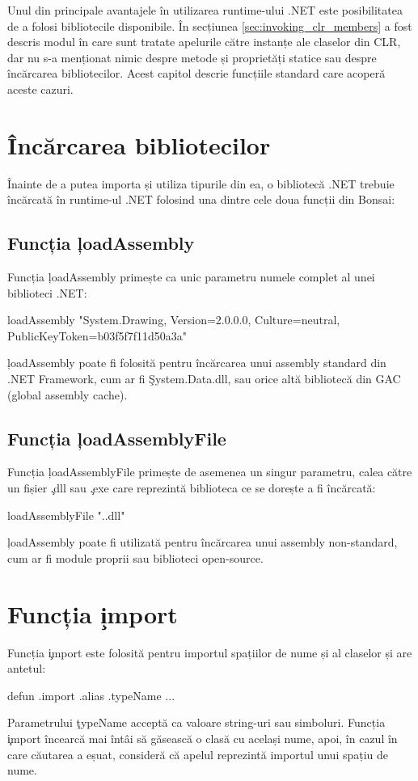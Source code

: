 \documentclass[12pt,a4paper]{memoir}
\begin{document}
Unul din principale avantajele în utilizarea runtime-ului .NET este posibilitatea de a folosi bibliotecile disponibile. În secțiunea \ref{sec:invoking_clr_members} a fost descris modul în care sunt tratate apelurile către instanțe ale claselor din CLR, dar nu s-a menționat nimic despre metode și proprietăți statice sau despre încărcarea bibliotecilor. Acest capitol descrie funcțiile standard care acoperă aceste cazuri.

\section{Încărcarea bibliotecilor}

Înainte de a putea importa și utiliza tipurile din ea, o bibliotecă .NET trebuie încărcată în runtime-ul .NET folosind una dintre cele doua funcții din Bonsai:

\subsection{Funcția \c{loadAssembly}}

Funcția \c{loadAssembly} primește ca unic parametru numele complet al unei biblioteci .NET:
\begin{code}
loadAssembly "System.Drawing, Version=2.0.0.0, Culture=neutral, 
              PublicKeyToken=b03f5f7f11d50a3a"
\end{code}
\c{loadAssembly} poate fi folosită pentru încărcarea unui assembly standard din .NET Framework, cum ar fi \c{System.Data.dll}, sau orice altă bibliotecă din GAC (global assembly cache).

\subsection{Funcția \c{loadAssemblyFile}}
Funcția \c{loadAssemblyFile} primește de asemenea un singur parametru, calea către un fișier \c{.dll} sau \c{.exe} care reprezintă biblioteca ce se dorește a fi încărcată:
\begin{code}
loadAssemblyFile ".\Lib\MyLibrary.dll"
\end{code}
\c{loadAssembly} poate fi utilizată pentru încărcarea unui assembly non-standard, cum ar fi module proprii sau biblioteci open-source.

\section{Funcția \c{import}}

Funcția \c{import} este folosită pentru importul spațiilor de nume și al claselor și are antetul:
\begin{code}
defun .import .alias .typeName { ... }
\end{code}
Parametrului \c{typeName} acceptă ca valoare string-uri sau simboluri. Funcția \c{import} încearcă mai întâi să găsească o clasă cu același nume, apoi, în cazul în care căutarea a eșuat, consideră că apelul reprezintă importul unui spațiu de nume.
\end{document}
